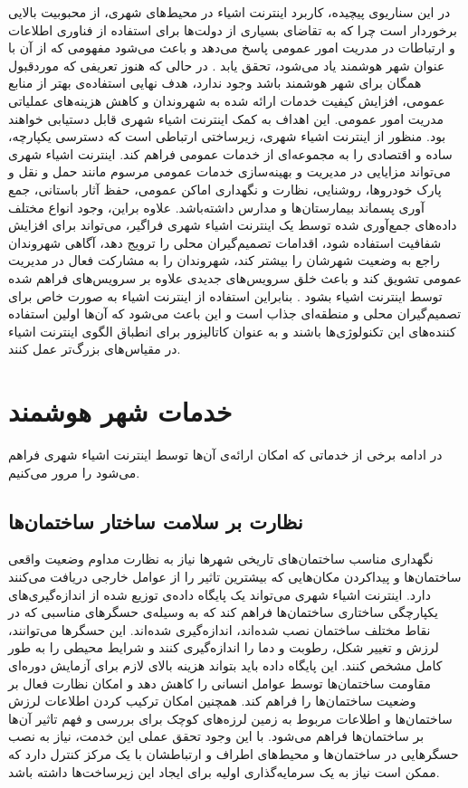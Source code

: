     در این سناریوی پیچیده، کاربرد اینترنت اشیاء در محیط‌های شهری، از محبوبیت بالایی برخوردار است چرا که به تقاضای بسیاری از دولت‌ها برای استفاده از فناوری‌ اطلاعات و ارتباطات در مدریت امور عمومی پاسخ می‌دهد و باعث می‌شود مفهومی که از آن با عنوان شهر هوشمند یاد می‌شود، تحقق یابد \cite{schaffers2011smart}.
    در حالی که هنوز تعریفی که موردقبول همگان برای شهر هوشمند باشد وجود ندارد، هدف نهایی استفاده‌ی بهتر از منابع عمومی، افزایش کیفیت خدمات ارائه شده به شهروندان و کاهش هزینه‌های عملیاتی مدریت امور عمومی.
    این اهداف به کمک اینترنت اشیاء شهری قابل دستیابی خواهند بود.
    منظور از اینترنت اشیاء شهری، زیرساختی ارتباطی است که دسترسی یکپارچه، ساده و اقتصادی را به مجموعه‌ای از خدمات عمومی فراهم کند.
    اینترنت اشیاء شهری می‌تواند مزایایی در مدیریت و بهینه‌سازی خدمات عمومی مرسوم مانند حمل و نقل و پارک خودرو‌ها، روشنایی، نظارت و نگهداری اماکن عمومی، حفظ آثار باستانی، جمع آوری پسماند بیمارستان‌ها و مدارس داشته‌باشد.
    علاوه براین، وجود انواع مختلف داده‌های جمع‌آوری شده توسط یک اینترنت اشیاء شهری فراگیر، می‌تواند برای افزایش شفافیت استفاده شود، اقدامات تصمیم‌گیران محلی را ترویج دهد، آگاهی شهروندان راجع به وضعیت شهرشان را بیشتر کند، شهروندان را به مشارکت فعال در مدیریت عمومی تشویق کند و باعث خلق سرویس‌های جدیدی علاوه بر سرویس‌های فراهم شده توسط اینترنت اشیاء بشود \cite{cuff2008urban}.
    بنابراین استفاده از اینترنت اشیاء به صورت خاص برای تصمیم‌گیران محلی و منطقه‌ای جذاب است و این باعث می‌شود که آن‌ها اولین استفاده کننده‌های این تکنولوژی‌ها باشند و به عنوان کاتالیزور برای انطباق الگوی اینترنت اشیاء در مقیاس‌های بزرگ‌تر عمل کنند.

    \section{خدمات شهر هوشمند}
    در ادامه برخی از خدماتی که امکان ارائه‌ی آن‌ها توسط اینترنت اشیاء شهری فراهم می‌شود را مرور می‌کنیم.
    \subsection{نظارت بر سلامت ساختار ساختمان‌ها}
      نگهداری مناسب ساختمان‌های تاریخی شهر‌ها نیاز به نظارت مداوم وضعیت واقعی ساختمان‌ها و پیدا‌کردن‌ مکان‌هایی که بیشترین تاثیر را از عوامل خارجی دریافت می‌کنند دارد.
      اینترنت اشیاء شهری می‌تواند یک پایگاه داده‌ی توزیع شده از اندازه‌گیری‌های یکپارچگی ساختاری ساختمان‌ها فراهم ‌کند که به وسیله‌ی حسگر‌های مناسبی که در نقاط مختلف ساختمان نصب شده‌اند، اندازه‌گیری شده‌اند.
      این حسگر‌ها می‌توانند، لرزش و تغییر شکل، رطوبت و دما را اندازه‌گیری کنند و شرایط محیطی را به طور کامل مشخص کنند\cite{lynch2006summary}.
      این پایگاه داده باید بتواند هزینه بالای لازم برای آزمایش دوره‌ای مقاومت ساختمان‌ها توسط عوامل انسانی را کاهش دهد و امکان نظارت فعال بر وضعیت ساختمان‌ها را فراهم کند.
      همچنین امکان ترکیب کردن اطلاعات لرزش ساختمان‌ها و اطلاعات مربوط به زمین لرزه‌های کوچک برای بررسی و فهم تاثیر آن‌ها بر ساختمان‌ها فراهم می‌شود.
      با این وجود تحقق عملی این خدمت، نیاز به نصب حسگر‌هایی در ساختمان‌ها و محیط‌های اطراف و ارتباطشان با یک مرکز کنترل دارد که ممکن است نیاز به یک سرمایه‌گذاری اولیه برای ایجاد این زیرساخت‌ها داشته باشد.

